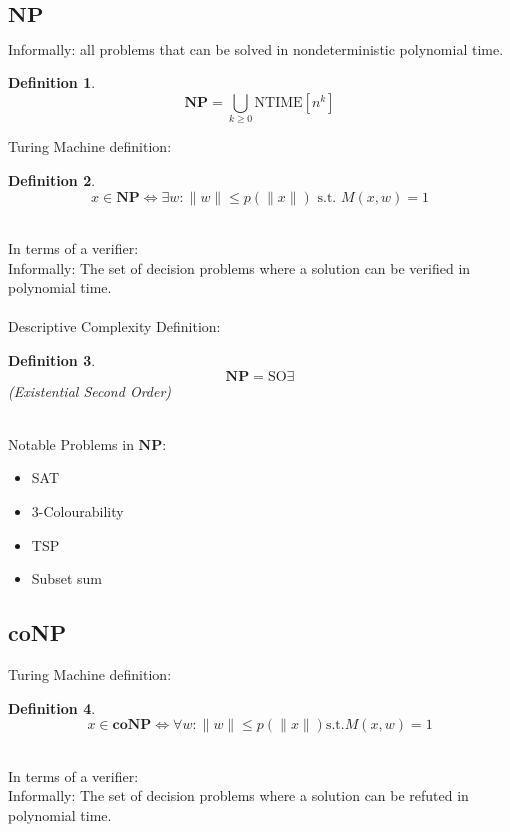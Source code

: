 \documentclass[]{article}
\theoremstyle{break}
\theoremstyle{break}
\newtheorem{definition}{Definition}[section]
\begin{document}
\subsection{$\mathbf{NP}$}
\label{sec:NP}
Informally: all problems that can be solved in nondeterministic polynomial time.
\begin{definition}
	$$\mathbf{NP} = \bigcup_{k\geq 0} \hyperref[sec:NTIME]{\text{NTIME}}[n^{k}]$$
\end{definition}
$ $
\\
Turing Machine definition:
\begin{definition}
	$$x \in \mathbf{NP}\iff \exists w : \|w\| \leq p(\|x\|) \text{ s.t. } M(x, w) = 1$$
\end{definition}
$ $
\\
\\
In terms of a verifier:
\\
Informally: The set of decision problems where a solution can be verified in polynomial time.
\\
\\
Descriptive Complexity Definition:
\begin{definition}
	$$\mathbf{NP} = \text{SO}\exists$$
	(Existential Second Order)
\end{definition}
$ $
\\
\\
Notable Problems in $\mathbf{NP}$:
\begin{itemize}
	\item SAT
	\item 3-Colourability
	\item TSP
	\item Subset sum
\end{itemize}
\subsection{coNP}
\label{sec:coNP}
Turing Machine definition:
\begin{definition}
	$$x \in \mathbf{coNP}\iff \forall w : \|w\| \leq p(\|x\|) \text{s.t.} M(x, w) = 1$$
\end{definition}
$ $
\\
\\
In terms of a verifier:
\\
Informally: The set of decision problems where a solution can be refuted in polynomial time.
\end{document}
